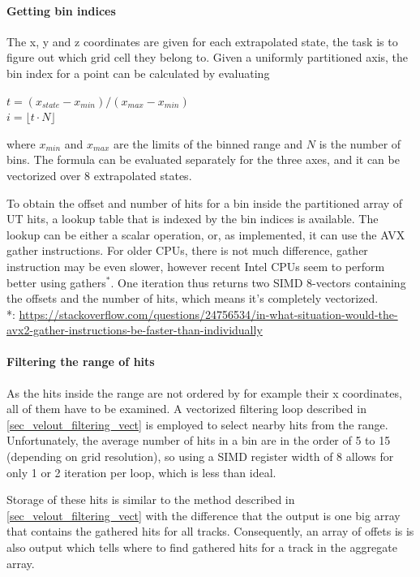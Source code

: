 \documentclass[12pt]{article}
\newcommand\tab[1][.7cm]{\hspace*{#1}}
\begin{document}
\paragraph{Getting bin indices} \mbox{}\vspace{0.4pc}

The x, y and z coordinates are given for each extrapolated state, the task is to figure out which grid cell they belong to. Given a uniformly partitioned axis, the bin index for a point can be calculated by evaluating
\begin{center}
	$t = (x_{state} - x_{min})/(x_{max} - x_{min})$\\
	$i =  \lfloor t \cdot N \rfloor$	
\end{center}
where $x_{min}$ and $x_{max}$ are the limits of the binned range and $N$ is the number of bins. The formula can be evaluated separately for the three axes, and it can be vectorized over 8 extrapolated states.

To obtain the offset and number of hits for a bin inside the partitioned array of UT hits, a lookup table that is indexed by the bin indices is available. The lookup can be either a scalar operation, or, as implemented, it can use the AVX gather instructions. For older CPUs, there is not much difference, gather instruction may be even slower, however recent Intel CPUs seem to perform better using gathers$^*$. One iteration thus returns two SIMD 8-vectors containing the offsets and the number of hits, which means it's completely vectorized.
\\
{
	\tiny
	\tab *: \url{https://stackoverflow.com/questions/24756534/in-what-situation-would-the-avx2-gather-instructions-be-faster-than-individually}
}

\paragraph{Filtering the range of hits} \mbox{}\vspace{0.4pc}

As the hits inside the range are not ordered by for example their x coordinates, all of them have to be examined. A vectorized filtering loop described in \ref{sec_velout_filtering_vect} is employed to select nearby hits from the range. Unfortunately, the average number of hits in a bin are in the order of 5 to 15 (depending on grid resolution), so using a SIMD register width of 8 allows for only 1 or 2 iteration per loop, which is less than ideal.

Storage of these hits is similar to the method described in \ref{sec_velout_filtering_vect} with the difference that the output is one big array that contains the gathered hits for all tracks. Consequently, an array of offets is is also output which tells where to find gathered hits for a track in the aggregate array.
\end{document}
